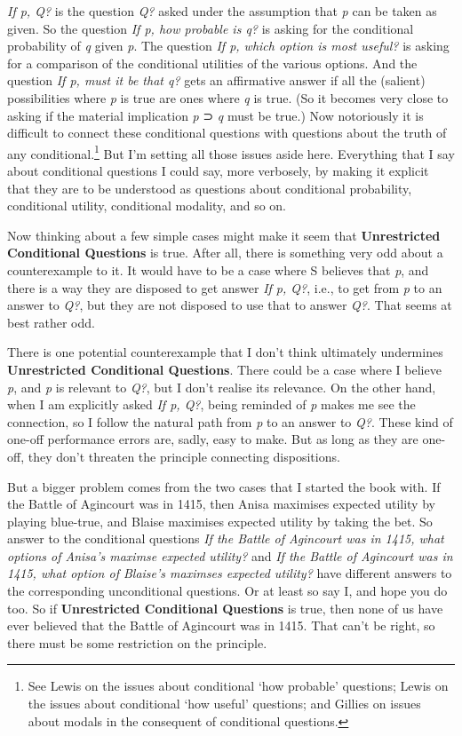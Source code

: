 \documentclass[
  11pt,
]{book}
\begin{document}
\emph{If p, Q?} is the question \emph{Q?} asked under the assumption that \emph{p} can be taken as given. So the question \emph{If p, how probable is q?} is asking for the conditional probability of \emph{q} given \emph{p}. The question \emph{If p, which option is most useful?} is asking for a comparison of the conditional utilities of the various options. And the question \emph{If p, must it be that q?} gets an affirmative answer if all the (salient) possibilities where \emph{p} is true are ones where \emph{q} is true. (So it becomes very close to asking if the material implication \emph{p} ⊃ \emph{q} must be true.) Now notoriously it is difficult to connect these conditional questions with questions about the truth of any conditional.\footnote{See Lewis \citetext{\citeyear{Lewis1976b}; \citeyear{Lewis1986h}} on the issues about conditional `how probable' questions; Lewis \citetext{\citeyear{Lewis1988}; \citeyear{Lewis1996}} on the issues about conditional `how useful' questions; and Gillies \citeyearpar{Gillies2010} on issues about modals in the consequent of conditional questions.} But I'm setting all those issues aside here. Everything that I say about conditional questions I could say, more verbosely, by making it explicit that they are to be understood as questions about conditional probability, conditional utility, conditional modality, and so on.

Now thinking about a few simple cases might make it seem that \textbf{Unrestricted Conditional Questions} is true. After all, there is something very odd about a counterexample to it. It would have to be a case where S believes that \emph{p}, and there is a way they are disposed to get answer \emph{If p, Q?}, i.e., to get from \emph{p} to an answer to \emph{Q?}, but they are not disposed to use that to answer \emph{Q?}. That seems at best rather odd.

There is one potential counterexample that I don't think ultimately undermines \textbf{Unrestricted Conditional Questions}. There could be a case where I believe \emph{p}, and \emph{p} is relevant to \emph{Q?}, but I don't realise its relevance. On the other hand, when I am explicitly asked \emph{If p, Q?}, being reminded of \emph{p} makes me see the connection, so I follow the natural path from \emph{p} to an answer to \emph{Q?}. These kind of one-off performance errors are, sadly, easy to make. But as long as they are one-off, they don't threaten the principle connecting dispositions.

But a bigger problem comes from the two cases that I started the book with. If the Battle of Agincourt was in 1415, then Anisa maximises expected utility by playing blue-true, and Blaise maximises expected utility by taking the bet. So answer to the conditional questions \emph{If the Battle of Agincourt was in 1415, what options of Anisa's maximse expected utility?} and \emph{If the Battle of Agincourt was in 1415, what option of Blaise's maximses expected utility?} have different answers to the corresponding unconditional questions. Or at least so say I, and hope you do too. So if \textbf{Unrestricted Conditional Questions} is true, then none of us have ever believed that the Battle of Agincourt was in 1415. That can't be right, so there must be some restriction on the principle.
\end{document}
